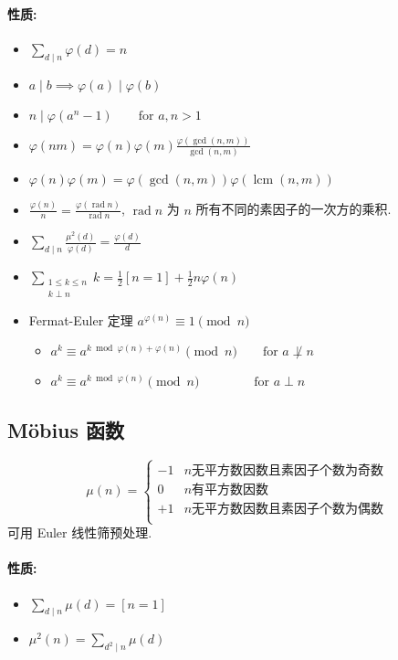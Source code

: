 \paragraph{性质:}
\begin{itemize}
  \item $\displaystyle\sum_{d\mid n}\varphi(d)=n$
  \item $a\mid b\implies\varphi(a)\mid\varphi(b)$
  \item $n\mid\varphi(a^n-1)\qquad\text{for }a,n>1$
  \item $\displaystyle\varphi(nm)=\varphi(n)\varphi(m)\frac{\varphi(\gcd(n,m))}{\gcd(n,m)}$
  \item $\varphi(n)\varphi(m)=\varphi(\gcd(n,m))\varphi(\operatorname{lcm}(n,m))$
  \item $\displaystyle\frac{\varphi(n)}n=\frac{\varphi(\operatorname{rad}n)}{\operatorname{rad}n}$, $\operatorname{rad}n$ 为 $n$ 所有不同的素因子的一次方的乘积.
  \item $\displaystyle\sum_{d\mid n}\frac{\mu^2(d)}{\varphi(d)}=\frac{\varphi(d)}d$
  \item $\displaystyle\sum_{\substack{1\le k\le n\\k\perp n}}k=\frac12[n=1]+\frac12n\varphi(n)$
  \item Fermat-Euler 定理 $a^{\varphi(n)}\equiv1\pmod n$
  \begin{itemize}
    \item $a^k\equiv a^{k\bmod\varphi(n)+\varphi(n)}\pmod n\qquad\text{for }a\not\perp n$
    \item $a^k\equiv a^{k\bmod\varphi(n)}\pmod n\qquad\qquad\;\!\text{for }a\perp n$
  \end{itemize}
\end{itemize}

\subsection{Möbius 函数}
\[
  \mu(n)=\begin{cases}
    -1&n\text{无平方数因数且素因子个数为奇数}\\
    0&n\text{有平方数因数}\\
    +1&n\text{无平方数因数且素因子个数为偶数}\\
  \end{cases}
\]
可用 Euler 线性筛预处理.

\paragraph{性质:}
\begin{itemize}
  \item $\displaystyle\sum_{d\mid n}\mu(d)=[n=1]$
  \item $\displaystyle\mu^2(n)=\sum_{d^2\mid n}\mu(d)$
\end{itemize}

